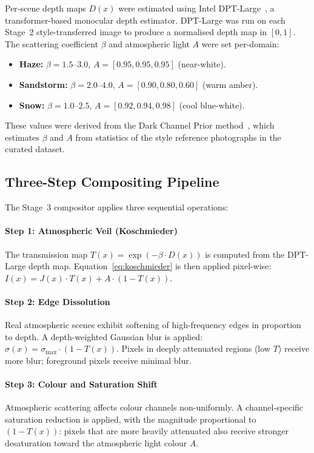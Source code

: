 \noindent Per-scene depth maps $D(x)$ were estimated using Intel DPT-Large~\cite{ranftl2021dpt}, a transformer-based monocular depth estimator. DPT-Large was run on each Stage~2 style-transferred image to produce a normalised depth map in $[0, 1]$. The scattering coefficient $\beta$ and atmospheric light $A$ were set per-domain:

\begin{itemize}
    \item \textbf{Haze:} $\beta = 1.5$--$3.0$, $A = [0.95, 0.95, 0.95]$ (near-white).
    \item \textbf{Sandstorm:} $\beta = 2.0$--$4.0$, $A = [0.90, 0.80, 0.60]$ (warm amber).
    \item \textbf{Snow:} $\beta = 1.0$--$2.5$, $A = [0.92, 0.94, 0.98]$ (cool blue-white).
\end{itemize}

\noindent These values were derived from the Dark Channel Prior method~\cite{he2009dark}, which estimates $\beta$ and $A$ from statistics of the style reference photographs in the curated dataset.

\FloatBarrier
\subsection{Three-Step Compositing Pipeline}
\label{sec:compositing}

\noindent The Stage~3 compositor applies three sequential operations:

\paragraph{Step 1: Atmospheric Veil (Koschmieder)}
The transmission map $T(x) = \exp(-\beta \cdot D(x))$ is computed from the DPT-Large depth map. Equation~\ref{eq:koschmieder} is then applied pixel-wise: $I(x) = J(x) \cdot T(x) + A \cdot (1 - T(x))$.

\paragraph{Step 2: Edge Dissolution}
Real atmospheric scenes exhibit softening of high-frequency edges in proportion to depth. A depth-weighted Gaussian blur is applied: $\sigma(x) = \sigma_\mathrm{max} \cdot (1 - T(x))$. Pixels in deeply attenuated regions (low $T$) receive more blur; foreground pixels receive minimal blur.

\paragraph{Step 3: Colour and Saturation Shift}
Atmospheric scattering affects colour channels non-uniformly. A channel-specific saturation reduction is applied, with the magnitude proportional to $(1 - T(x))$: pixels that are more heavily attenuated also receive stronger desaturation toward the atmospheric light colour $A$.


